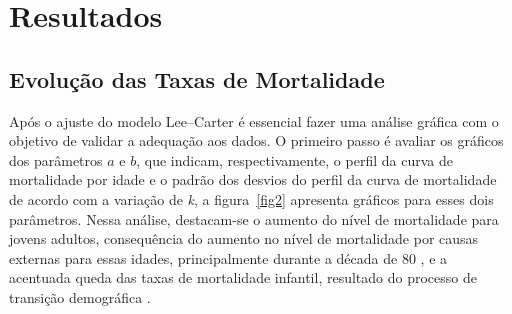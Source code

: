 \documentclass[12pt, 						%
			openright, 					%
			twoside,					%
			a4paper,x					%
			english,					%
			brazil]{abntex2}				%
\begin{document}

\chapter{Resultados \label{cap4}}
	\section{Evolução das Taxas de Mortalidade \label{sec4.1}}
	Após o ajuste do modelo Lee--Carter é essencial fazer uma análise gráfica com o objetivo de validar a adequação aos dados. O primeiro passo é avaliar os gráficos dos parâmetros $a$ e $b$, que indicam, respectivamente, o perfil da curva de mortalidade por idade e o padrão dos desvios do perfil da curva de mortalidade de acordo com a variação de \textit{k}, a figura~\ref{fig2} apresenta gráficos para esses dois parâmetros. Nessa análise, destacam-se o aumento do nível de mortalidade para jovens adultos, consequência do aumento no nível de mortalidade por causas externas para essas idades, principalmente durante a década de 80 \cite{araujo1998mortalidade}, e a acentuada queda das taxas de mortalidade infantil, resultado do processo de transição demográfica \cite{brito2008transiccao}.\\
\end{document}

